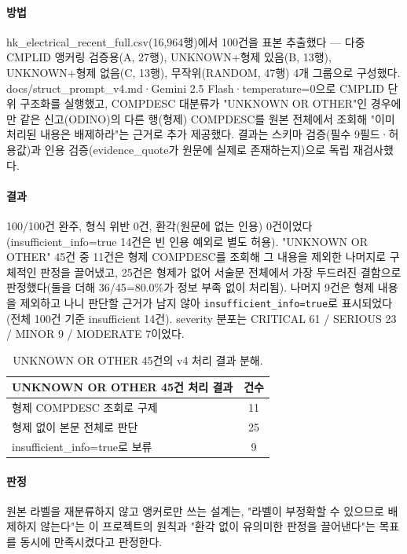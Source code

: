 \documentclass[11pt]{article}
\begin{document}
\paragraph{방법} hk\_electrical\_recent\_full.csv(16,964행)에서 100건을 표본 추출했다 — 다중 CMPLID 앵커링 검증용(A, 27행), UNKNOWN+형제 있음(B, 13행), UNKNOWN+형제 없음(C, 13행), 무작위(RANDOM, 47행) 4개 그룹으로 구성했다. docs/struct\_prompt\_v4.md·Gemini 2.5 Flash·temperature=0으로 CMPLID 단위 구조화를 실행했고, COMPDESC 대분류가 "UNKNOWN OR OTHER"인 경우에만 같은 신고(ODINO)의 다른 행(형제) COMPDESC를 원본 전체에서 조회해 "이미 처리된 내용은 배제하라"는 근거로 추가 제공했다. 결과는 스키마 검증(필수 9필드·허용값)과 인용 검증(evidence\_quote가 원문에 실제로 존재하는지)으로 독립 재검사했다.

\paragraph{결과} 100/100건 완주, 형식 위반 0건, 환각(원문에 없는 인용) 0건이었다(insufficient\_info=true 14건은 빈 인용 예외로 별도 허용).
"UNKNOWN OR OTHER" 45건 중 11건은 형제 COMPDESC를 조회해 그 내용을 제외한 나머지로 구체적인 판정을 끌어냈고, 25건은 형제가 없어 서술문 전체에서 가장 두드러진 결함으로 판정했다(둘을 더해 36/45=80.0\%가 정보 부족 없이 처리됨). 나머지 9건은 형제 내용을 제외하고 나니 판단할 근거가 남지 않아 \texttt{insufficient\_info=true}로 표시되었다(전체 100건 기준 insufficient 14건).
severity 분포는 CRITICAL 61 / SERIOUS 23 / MINOR 9 / MODERATE 7이었다.

\begin{table}[H]
\centering
\small
\begin{tabular}{lc}
\toprule
UNKNOWN OR OTHER 45건 처리 결과 & 건수 \\
\midrule
형제 COMPDESC 조회로 구제 & 11 \\
형제 없이 본문 전체로 판단 & 25 \\
insufficient\_info=true로 보류 & 9 \\
\bottomrule
\end{tabular}
\caption{UNKNOWN OR OTHER 45건의 v4 처리 결과 분해.}
\label{tab:v4-unknown}
\end{table}

\paragraph{판정} 원본 라벨을 재분류하지 않고 앵커로만 쓰는 설계는, "라벨이 부정확할 수 있으므로 배제하지 않는다"는 이 프로젝트의 원칙과 "환각 없이 유의미한 판정을 끌어낸다"는 목표를 동시에 만족시켰다고 판정한다.
\end{document}
